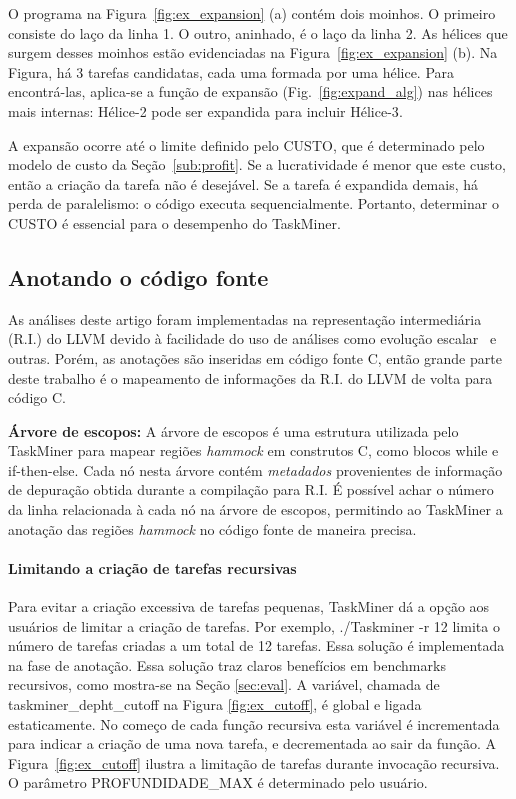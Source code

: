 \documentclass[sigplan,10pt]{acmart}
\newcommand\Taskminer{\mbox{\textsf{TaskMiner}}}
\begin{document}
O programa na Figura~\ref{fig:ex_expansion} (a) contém dois moinhos.
O primeiro consiste do laço da linha 1. O outro, aninhado, é o laço da linha 2.
As hélices que surgem desses moinhos estão evidenciadas na Figura~\ref{fig:ex_expansion} (b).
Na Figura, há 3 tarefas candidatas, cada uma formada por uma hélice.
Para encontrá-las, aplica-se a função de expansão (Fig.~\ref{fig:expand_alg})
nas hélices mais internas: \textsf{Hélice-2} pode ser expandida para incluir \textsf{Hélice-3}.

A expansão ocorre até o limite definido pelo \textsf{CUSTO}, que é determinado pelo modelo de custo
da Seção~\ref{sub:profit}. Se a lucratividade é menor que este custo, então
a criação da tarefa não é desejável. Se a tarefa é expandida demais, 
há perda de paralelismo: o código executa sequencialmente. Portanto, determinar o \textsf{CUSTO}
é essencial para o desempenho do {\Taskminer}.

\subsection{Anotando o código fonte}
\label{sub:ir}

As análises deste artigo foram implementadas na representação intermediária (R.I.)
do LLVM devido à facilidade do uso de análises como evolução escalar~\cite[p.18]{Grosser12} e outras.
Porém, as anotações são inseridas em código fonte C, então grande
parte deste trabalho é o mapeamento de informações da R.I. do LLVM de volta
para código C.

\noindent
\textbf{Árvore de escopos:}
A árvore de escopos é uma estrutura utilizada pelo {\Taskminer} para mapear regiões {\em hammock} em construtos C, como blocos
\textsf{while} e \textsf{if-then-else}. Cada nó nesta árvore contém {\em metadados}
provenientes de informação de depuração obtida durante a compilação para R.I.
É possível achar o número da linha relacionada à cada nó na árvore de escopos, permitindo
ao {\Taskminer} a anotação das regiões {\em hammock} no código fonte de maneira precisa.

\paragraph{Limitando a criação de tarefas recursivas}
Para evitar a criação excessiva de tarefas pequenas, {\Taskminer} dá a opção
aos usuários de limitar a criação de tarefas. Por exemplo, \textsf{./Taskminer -r 12} limita o número
de tarefas criadas a um total de 12 tarefas. Essa solução é implementada na fase de anotação. 
Essa solução traz claros benefícios em benchmarks recursivos, como mostra-se na Seção \ref{sec:eval}. 
A variável, chamada de \textsf{taskminer\_depht\_cutoff} na Figura
\ref{fig:ex_cutoff}, é global e ligada estaticamente. 
No começo de cada função recursiva
esta variável é incrementada para indicar a criação de uma nova tarefa, 
e decrementada ao sair da função.
A Figura~\ref{fig:ex_cutoff} ilustra a limitação de tarefas 
durante invocação recursiva.
O parâmetro \textsf{PROFUNDIDADE\_MAX}
é determinado pelo usuário.
\end{document}
